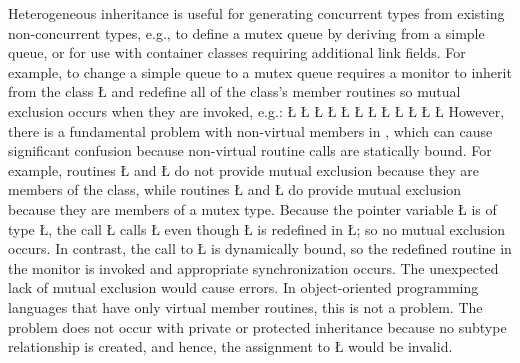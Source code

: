 \documentclass[openright,twoside]{report}
\begin{document}
Heterogeneous inheritance is useful for generating concurrent types from existing non-concurrent types, e.g., to define a mutex queue by deriving from a simple queue, or for use with container classes requiring additional link fields.
For example, to change a simple queue to a mutex queue requires a monitor to inherit from the class \LGinlinetrue\LGbegin\lgrinde\L{}\endlgrinde\LGend{} and redefine all of the class's member routines so mutual exclusion occurs when they are invoked, e.g.:
\LGinlinefalse\LGbegin\lgrinde
\L{}
\CE{}\L{}
\L{\LB{}}
\L{\LB{}}
\L{\LB{\};}}
\L{}
\CE{}\L{\LB{}}
\L{\LB{}}
\L{\LB{\};}}
\L{}
\CE{}\L{}
\CE{}\L{}
\CE{}\endlgrinde\LGend
However, there is a fundamental problem with non-virtual members in \CC, which can cause significant confusion because non-virtual routine calls are statically bound.
For example, routines \LGinlinetrue\LGbegin\lgrinde\L{}\endlgrinde\LGend{} and \LGinlinetrue\LGbegin\lgrinde\L{}\endlgrinde\LGend{} do not provide mutual exclusion because they are members of the class, while routines \LGinlinetrue\LGbegin\lgrinde\L{}\endlgrinde\LGend{} and \LGinlinetrue\LGbegin\lgrinde\L{}\endlgrinde\LGend{} do provide mutual exclusion because they are members of a mutex type.
Because the pointer variable \LGinlinetrue\LGbegin\lgrinde\L{}\endlgrinde\LGend{} is of type \LGinlinetrue\LGbegin\lgrinde\L{}\endlgrinde\LGend{}, the call \LGinlinetrue\LGbegin\lgrinde\L{}\endlgrinde\LGend{} calls \LGinlinetrue\LGbegin\lgrinde\L{}\endlgrinde\LGend{} even though \LGinlinetrue\LGbegin\lgrinde\L{}\endlgrinde\LGend{} is redefined in \LGinlinetrue\LGbegin\lgrinde\L{}\endlgrinde\LGend{};
so no mutual exclusion occurs.
In contrast, the call to \LGinlinetrue\LGbegin\lgrinde\L{}\endlgrinde\LGend{} is dynamically bound, so the redefined routine in the monitor is invoked and appropriate synchronization occurs.
The unexpected lack of mutual exclusion would cause errors.
In object-oriented programming languages that have only virtual member routines, this is not a problem.
The problem does not occur with private or protected inheritance because no subtype relationship is created, and hence, the assignment to \LGinlinetrue\LGbegin\lgrinde\L{}\endlgrinde\LGend{} would be invalid.
\end{document}
